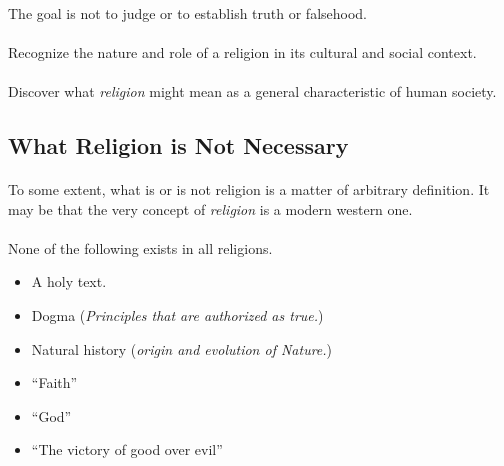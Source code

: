 \documentclass{article}
\begin{document}
	\paragraph{} The goal is not to judge or to establish truth or falsehood.
	\paragraph{} Recognize the nature and role of a religion in its cultural and social context.
	\paragraph{} Discover what \emph{religion} might mean as a general characteristic of human society.

	\subsection{What Religion is Not Necessary}
	\paragraph{} To some extent, what is or is not religion is a matter of arbitrary definition. It may be that the very concept of \emph{religion} is a modern western one.
	\paragraph{} None of the following exists in all religions.
	\begin{itemize}
		\item A holy text.
		\item Dogma (\emph{Principles that are authorized as true.})
		\item Natural history (\emph{origin and evolution of Nature.})
		\item ``Faith'' 
		\item ``God''
		\item ``The victory of good over evil''
	\end{itemize}
\end{document}
